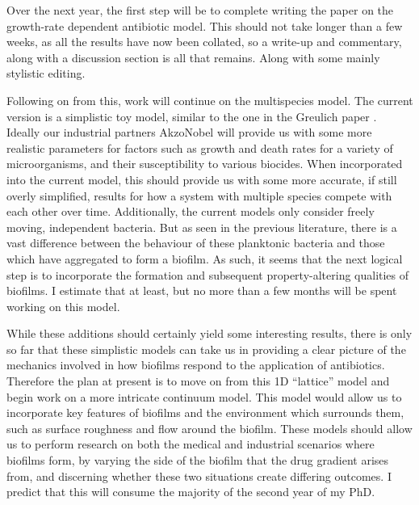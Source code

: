 \documentclass[a4paper,12pt]{article}
\begin{document}
Over the next year, the first step will be to complete writing the paper on the growth-rate dependent antibiotic model.  This should not take longer than a few weeks, as all 
the results have now been collated, so a write-up and commentary, along with a discussion section is all that remains.  Along with some mainly stylistic editing.

Following on from this, work will continue on the multispecies model.  The current version is a simplistic toy model, similar to the one in the 
Greulich paper \cite{bioref:Greulich-growthDependentAntibiotics}.  Ideally our industrial partners AkzoNobel will provide us with some more realistic parameters for factors such as 
growth and death rates for a variety of microorganisms, and their susceptibility to various biocides.  When incorporated into the current model, this should provide us with some more 
accurate, if still overly simplified, results for how a system with multiple species compete with each other over time.  Additionally, the current models only consider freely 
moving, independent bacteria.  But as seen in the previous literature, there is a vast difference between the behaviour of these  planktonic bacteria and those which have 
aggregated to form a biofilm.  As such, it seems that the next logical step is to incorporate the formation and subsequent property-altering qualities of biofilms.  I estimate 
that at least, but no more than a few months will be spent working on this model.

While these additions should certainly yield some interesting results, there is only so far that these simplistic models can take us in providing a clear picture of the mechanics 
involved in how biofilms respond to the application of antibiotics.  Therefore the plan at present is to move on from this 1D ``lattice'' model and begin work on a more 
intricate continuum model.  This model would allow us to incorporate key features of biofilms and the environment which surrounds them, such as surface roughness and flow around 
the biofilm.  These models should allow us to perform research on both the medical and industrial scenarios where biofilms form, by varying the side of the biofilm that the 
drug gradient arises from, and discerning whether these two situations create differing outcomes.  I predict that this will consume the majority of the second year of my PhD.
\end{document}

